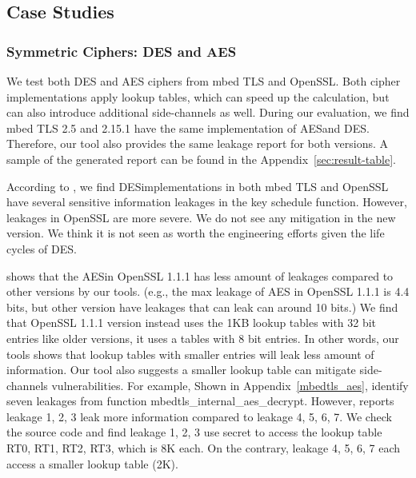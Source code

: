 \subsection{Case Studies}

\subsubsection{Symmetric Ciphers: DES and AES}\label{eval:sym}
We test both DES and AES ciphers from mbed TLS and OpenSSL. Both cipher
implementations apply lookup tables, which can
speed up the calculation, but can also introduce additional side-channels
as well. During our evaluation, we find mbed TLS 2.5 and 2.15.1 have the same
implementation of AES\@ and DES\@. Therefore, our tool also provides the same 
leakage report for both
versions. A sample of the generated report can be found in the Appendix~\ref{sec:result-table}.

According to \tool{}, we find DES\@ implementations in both mbed TLS and OpenSSL have several
sensitive information leakages in the key schedule function.
However, leakages in OpenSSL are more severe. We do not see any mitigation
in the new version. We think it is not seen as worth the engineering
efforts given the life cycles of DES\@.

\tool{} shows that the AES\@ in OpenSSL 1.1.1 
has less amount of leakages compared to other versions by our tools. 
(e.g., the max leakage of AES in OpenSSL 1.1.1 is 4.4 bits, but other version
have leakages that can leak can around 10 bits.)
We find that OpenSSL 1.1.1 version 
instead uses the 1KB lookup tables with 32 bit entries like older versions, it uses a 
tables with 8 bit entries. In other words, our tools shows that lookup tables with smaller 
entries will leak less amount of information. Our tool also suggests a smaller lookup
table can mitigate side-channels vulnerabilities. For example, Shown in Appendix~\ref{mbedtls_aes},
\tool{} identify seven leakages from function \textsf{mbedtls\_internal\_aes\_decrypt}.
However, \tool{} reports leakage 1, 2, 3 leak more information
compared to leakage 4, 5, 6, 7. 
We check the source code and find leakage 1, 2,
3 use secret to access the lookup table \textsf{RT0, RT1, RT2, RT3}, which is 8K
each. On the contrary, leakage 4, 5, 6, 7 each access a smaller lookup table
(2K).


